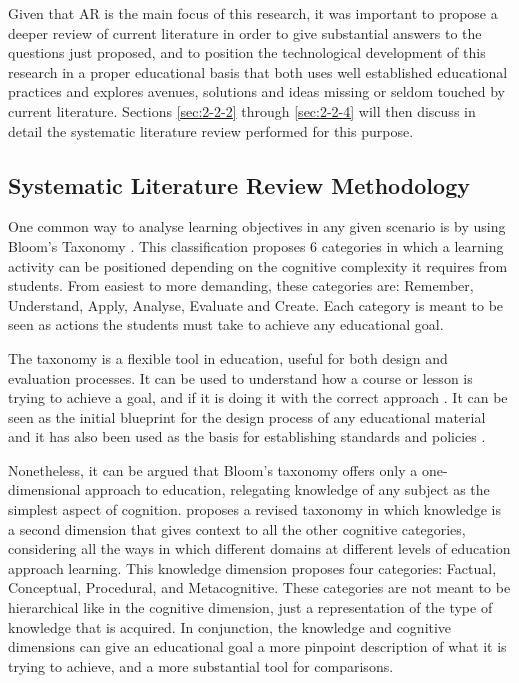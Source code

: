 Given that \ac{AR} is the main focus of this research, it was important to propose a deeper review of current literature in order to give substantial answers to the questions just proposed, and to position the technological development of this research in a proper educational basis that both uses well established educational
practices and explores avenues, solutions and ideas missing or seldom touched by current literature. Sections \ref{sec:2-2-2} through \ref{sec:2-2-4} will then discuss in detail the systematic literature review performed for this purpose.

\subsection{Systematic Literature Review Methodology \label{sec:2-2-2}}

One common way to analyse learning objectives in any given scenario is by using Bloom's Taxonomy \parencite{bloom_1964}. This classification proposes 6 categories in which a learning
activity can be positioned depending on the cognitive complexity it requires from students. From easiest to more demanding, these categories are: Remember, Understand, Apply, Analyse,
Evaluate and Create. Each category is meant to be seen as actions the students must take to achieve any educational goal.

The taxonomy is a flexible tool in education, useful for both design and evaluation processes. It can be used to understand how a course or lesson is trying to achieve a goal, and if it is
doing it with the correct approach \parencite{anderson_2001}. It can be seen as the initial blueprint for the design process of any educational material \parencite{healy_2011} and it has
also been used as the basis for establishing standards and policies \parencite{guskey_2001}.

Nonetheless, it can be argued that Bloom's taxonomy offers only a one-dimensional approach to education, relegating knowledge of any subject as the simplest aspect of cognition. \textcite{krathwohl_2002}
proposes a revised taxonomy in which knowledge is a second dimension that gives context to all the other cognitive categories, considering all the ways in which different domains at
different levels of education approach learning. This knowledge dimension proposes four categories: Factual, Conceptual, Procedural, and Metacognitive. These categories are not meant to be
hierarchical like in the cognitive dimension, just a representation of the type of knowledge that is acquired. In conjunction, the knowledge and cognitive dimensions can give an
educational goal a more pinpoint description of what it is trying to achieve, and a more substantial tool for comparisons.

